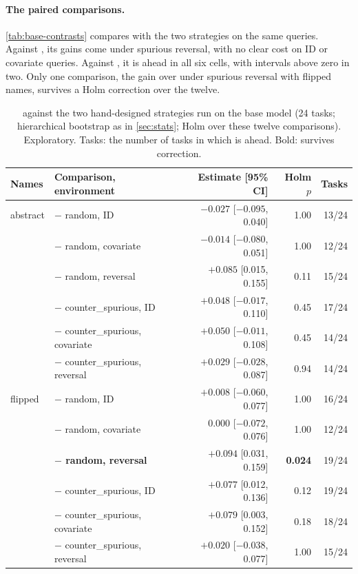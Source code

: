 \paragraph{The paired comparisons.}
\autoref{tab:base-contrasts} compares \sata with the two strategies on the same queries.
Against , its gains come under spurious reversal, with no clear cost on ID or covariate queries.
Against , it is ahead in all six cells, with intervals above zero in two.
Only one comparison, the gain over  under spurious reversal with flipped names, survives a Holm correction over the twelve.

\begin{table}[H]
\centering\small
\caption{\sata against the two hand-designed strategies run on the base model (24 tasks; hierarchical bootstrap as in \autoref{sec:stats}; Holm over these twelve comparisons). Exploratory. Tasks: the number of tasks in which \sata is ahead. Bold: survives correction.}
\label{tab:base-contrasts}
\begin{tabular}{@{}llrrr@{}}
\toprule
\textbf{Names} & \textbf{Comparison, environment} & \textbf{Estimate [95\% CI]} & \textbf{Holm $p$} & \textbf{Tasks} \\
\midrule
abstract & \sata{} $-$ random, ID & $-0.027$ [$-0.095$, 0.040] & 1.00 & 13/24 \\
 & \sata{} $-$ random, covariate & $-0.014$ [$-0.080$, 0.051] & 1.00 & 12/24 \\
 & \sata{} $-$ random, reversal & $+0.085$ [0.015, 0.155] & 0.11 & 15/24 \\
 & \sata{} $-$ counter\_spurious, ID & $+0.048$ [$-0.017$, 0.110] & 0.45 & 17/24 \\
 & \sata{} $-$ counter\_spurious, covariate & $+0.050$ [$-0.011$, 0.108] & 0.45 & 14/24 \\
 & \sata{} $-$ counter\_spurious, reversal & $+0.029$ [$-0.028$, 0.087] & 0.94 & 14/24 \\
\midrule
flipped & \sata{} $-$ random, ID & $+0.008$ [$-0.060$, 0.077] & 1.00 & 16/24 \\
 & \sata{} $-$ random, covariate & $0.000$ [$-0.072$, 0.076] & 1.00 & 12/24 \\
 & \textbf{\sata{} $-$ random, reversal} & $\mathbf{+0.094}$ [0.031, 0.159] & \textbf{0.024} & 19/24 \\
 & \sata{} $-$ counter\_spurious, ID & $+0.077$ [0.012, 0.136] & 0.12 & 19/24 \\
 & \sata{} $-$ counter\_spurious, covariate & $+0.079$ [0.003, 0.152] & 0.18 & 18/24 \\
 & \sata{} $-$ counter\_spurious, reversal & $+0.020$ [$-0.038$, 0.077] & 1.00 & 15/24 \\
\bottomrule
\end{tabular}
\end{table}

